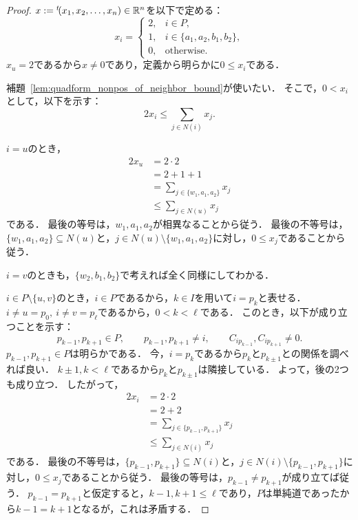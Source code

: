 \begin{proof}
  $x := {}^t\!(x_1, x_2, \ldots, x_n) \in \mathbb{R}^n$を以下で定める：
  \begin{equation}
    x_i = \begin{cases}
      2, & i \in P,\\
      1, & i \in \{a_1, a_2, b_1, b_2\},\\
      0, & \textrm{otherwise}.
    \end{cases}
  \end{equation}
  $x_u = 2$であるから$x \ne 0$であり，定義から明らかに$0 \le x_i$である．

  補題~\ref{lem:quadform_nonpos_of_neighbor_bound}が使いたい．
  そこで，$0 < x_i$として，以下を示す：
  \begin{equation}
    2 x_i \le \sum_{j \in N(i)} x_j.
  \end{equation}

  $i = u$のとき，
  \begin{align}
    2 x_u
    &= 2 \cdot 2 \\
    &= 2 + 1 + 1 \\
    &=  \sum_{j \in \{w_1, a_1, a_2\}} x_j \\
    &\le \sum_{j \in N(u)} x_j
  \end{align}
  である．
  最後の等号は，$w_1, a_1, a_2$が相異なることから従う．
  最後の不等号は，$\{w_1, a_1, a_2\} \subseteq N(u)$と，$j \in N(u) \setminus \{w_1, a_1, a_2\}$に対し，$0 \le x_j$であることから従う．

  $i = v$のときも，$\{w_2, b_1, b_2\}$で考えれば全く同様にしてわかる．

  $i \in P \setminus \{u, v\}$のとき，$i \in P$であるから，$k \in I$を用いて$i = p_k$と表せる．
  $i \ne u = p_0,\ i \ne v = p_\ell$であるから，$0 < k < \ell$である．
  このとき，以下が成り立つことを示す：
  \begin{equation}
    p_{k-1}, p_{k+1} \in P,\qquad
    p_{k-1}, p_{k+1} \ne i,\qquad
    C_{i p_{k-1}}, C_{i p_{k+1}} \ne 0.
  \end{equation}
  $p_{k-1}, p_{k+1} \in P$は明らかである．
  今，$i = p_k$であるから$p_k$と$p_{k \pm 1}$との関係を調べれば良い．
  $k \pm 1, k < \ell$であるから$p_k$と$p_{k\pm1}$は隣接している．
  よって，後の2つも成り立つ．
  したがって，
  \begin{align}
    2 x_i
    &= 2 \cdot 2 \\
    &= 2 + 2 \\
    &= \sum_{j \in \{p_{k-1}, p_{k+1}\}} x_j \\
    &\le \sum_{j \in N(i)} x_j
  \end{align}
  である．
  最後の不等号は，$\{p_{k-1}, p_{k+1}\} \subseteq N(i)$と，$j \in N(i) \setminus \{p_{k-1}, p_{k+1}\}$に対し，$0 \le x_j$であることから従う．
  最後の等号は，$p_{k-1} \ne p_{k+1}$が成り立てば従う．
  $p_{k-1} = p_{k+1}$と仮定すると，$k-1, k+1 \le \ell$であり，$P$は単純道であったから$k-1 = k+1$となるが，これは矛盾する．


\end{proof}
